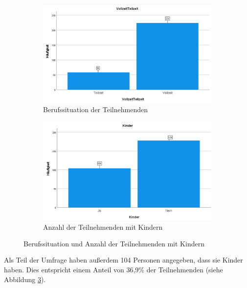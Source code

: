 \begin{figure}[h]
    \begin{subfigure}{0.49\textwidth}
        \centering
        \includegraphics[width=\textwidth]{04_Artefakte/01_Abbildungen/deskriptiv_teilzeit_vollzeit.png}
        \caption{Berufssituation der Teilnehmenden}
        \label{fig:berufssituation}
    \end{subfigure}
    \begin{subfigure}{0.49\textwidth}
        \centering
        \includegraphics[width=\textwidth]{04_Artefakte/01_Abbildungen/deskriptiv_kinder.png}
        \caption{Anzahl der Teilnehmenden mit Kindern}
        \label{fig:kinder}        
    \end{subfigure}
    \caption{Berufssituation und Anzahl der Teilnehmenden mit Kindern}
\end{figure}

Als Teil der Umfrage haben außerdem 104 Personen angegeben, dass sie Kinder haben. Dies entspricht einem 
Anteil von 36,9\% der Teilnehmenden (siehe Abbildung \ref{fig:kinder}).

